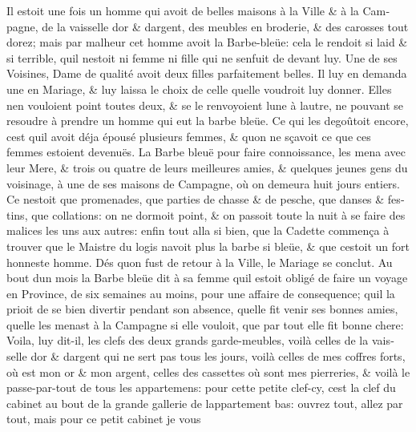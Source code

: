 \documentclass[14pt,a4paper]{memoir}
\begin{document}
{{\begin{otherlanguage}{french}
Il estoit une fois un homme qui avoit de belles maisons à la Ville \& à
la Campagne, de la vaisselle d\textquotesingle or \&
d\textquotesingle argent, des meubles en broderie, \& des carosses tout
dorez; mais par malheur cet homme avoit la Barbe-bleüe: cela le rendoit
si laid \& si terrible, qu\textquotesingle il n\textquotesingle estoit
ni femme ni fille qui ne s\textquotesingle enfuit de devant luy. Une de
ses Voisines, Dame de qualité avoit deux filles parfaitement belles. Il
luy en demanda une en Mariage, \& luy laissa le choix de celle
qu\textquotesingle elle voudroit luy donner. Elles n\textquotesingle en
vouloient point toutes deux, \& se le renvoyoient l\textquotesingle une
à l\textquotesingle autre, ne pouvant se resoudre à prendre un homme qui
eut la barbe bleüe. Ce qui les degoûtoit encore, c\textquotesingle est
qu\textquotesingle il avoit déja épousé plusieurs femmes, \&
qu\textquotesingle on ne sçavoit ce que ces femmes estoient devenuës. La
Barbe bleuë pour faire connoissance, les mena avec leur Mere, \& trois
ou quatre de leurs meilleures amies, \& quelques jeunes gens du
voisinage, à une de ses maisons de Campagne, où on demeura huit jours
entiers. Ce n\textquotesingle estoit que promenades, que parties de
chasse \& de pesche, que danses \& festins, que collations: on ne
dormoit point, \& on passoit toute la nuit à se faire des malices les
uns aux autres: enfin tout alla si bien, que la Cadette commença à
trouver que le Maistre du logis n\textquotesingle avoit plus la barbe si
bleüe, \& que c\textquotesingle estoit un fort honneste homme. Dés
qu\textquotesingle on fust de retour à la Ville, le Mariage se conclut.
Au bout d\textquotesingle un mois la Barbe bleüe dit à sa femme
qu\textquotesingle il estoit obligé de faire un voyage en Province, de
six semaines au moins, pour une affaire de consequence;
qu\textquotesingle il la prioit de se bien divertir pendant son absence,
qu\textquotesingle elle fit venir ses bonnes amies,
qu\textquotesingle elle les menast à la Campagne si elle vouloit, que
par tout elle fit bonne chere: Voila, luy dit-il, les clefs des deux
grands garde-meubles, voilà celles de la vaisselle d\textquotesingle or
\& d\textquotesingle argent qui ne sert pas tous les jours, voilà celles
de mes coffres forts, où est mon or \& mon argent, celles des cassettes
où sont mes pierreries, \& voilà le passe-par-tout de tous les
appartemens: pour cette petite clef-cy, c\textquotesingle est la clef du
cabinet au bout de la grande gallerie de l\textquotesingle appartement
bas: ouvrez tout, allez par tout, mais pour ce petit cabinet je vous

\end{otherlanguage}}}
\end{document}
